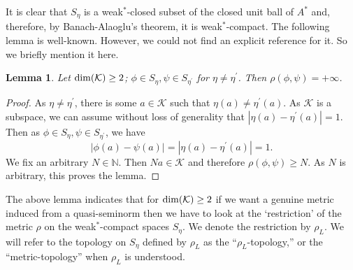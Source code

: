 \documentclass[a4paper,11pt,reqno]{amsart}
\theoremstyle{plain}
\newtheorem{lem}[thm]{Lemma}
\theoremstyle{named}
\numberwithin{equation}{section}
\begin{document}
			It is clear that \( S_{\eta} \) is a weak\(^*\)-closed subset of the closed unit ball of \( A^{\ast} \) and, therefore, by Banach-Alaoglu's theorem, it is weak\(^*\)-compact. The following lemma is well-known. However, we could not find an explicit reference for it. So we briefly mention it here.
			\begin{lem}
				Let ${\rm dim}(\mathcal K)\geq 2$; $\phi\in S_\eta, \psi\in S_{\eta^{\prime}}$ for $\eta\neq\eta^{\prime}$. Then $\rho(\phi,\psi)=+\infty$. 
			\end{lem}
			\begin{proof}
				As $\eta\neq\eta^{\prime}$, there is some $a\in\mathcal K$ such that $\eta(a)\neq\eta^{\prime}(a)$. As $\mathcal K$ is a subspace, we can assume without loss of generality that $|\eta(a)-\eta^{\prime}(a)|=1$. Then as $\phi\in S_{\eta}, \psi\in S_{\eta^{\prime}}$, we have 
				\begin{displaymath}
					|\phi(a)-\psi(a)|=|\eta(a)-\eta^{\prime}(a)|=1.
				\end{displaymath}
				We fix an arbitrary $N\in\mathbb{N}$. Then $Na\in\mathcal K$ and therefore $\rho(\phi,\psi)\geq N$. As $N$ is arbitrary, this proves the lemma.
			\end{proof}
			
			
			
			
			The above lemma indicates that for ${\rm dim}(\mathcal K)\geq 2$ if we want a genuine metric induced from a quasi-seminorm then we have to look at the `restriction' of the metric $\rho$ on the weak$^\ast$-compact spaces $S_{\eta}$. We denote the restriction by $\rho_{L}$.
			We will refer to the topology on $S_{\eta}$ defined by $\rho_L$ as the ``$\rho_L$-topology,'' or the ``metric-topology'' when $\rho_L$ is understood.
			
\end{document}
